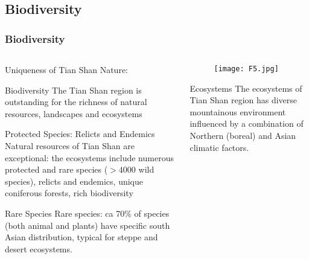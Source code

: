 \documentclass[pdflatex,compress,8pt,
	xcolor={dvipsnames,dvipsnames,svgnames,x11names,table},
	hyperref={colorlinks = true,
	breaklinks = true, 
	urlcolor = NavyBlue, 
	breaklinks = true}]{beamer}
\begin{document}
\subsection{Biodiversity}
\begin{frame}\frametitle{Biodiversity}
\begin{minipage}[0.4\textheight]{\textwidth}
\begin{columns}[T]
\begin{column}{0.5\textwidth}
Uniqueness of Tian Shan Nature:

\begin{alertblock}{Biodiversity}
The Tian Shan region is outstanding for the richness of natural resources, landscapes and ecosystems
\end{alertblock}

\begin{block}{Protected Species: Relicts and Endemics}
Natural resources of Tian Shan are exceptional: the ecosystems include numerous protected and rare species ($> 4000$ wild species), relicts and endemics, unique coniferous forests, rich biodiversity
\end{block}

\begin{examples}{Rare Species}
Rare species: ca 70\% of species (both animal and plants) have specific south Asian distribution, typical for steppe and desert ecosystems.
\end{examples}

\end{column}
\begin{column}{0.5\textwidth}

\begin{figure}[H]
	\centering
		\texttt{[image: F5.jpg]}
\end{figure}
\begin{block}{Ecosystems}
The ecosystems of Tian Shan region has diverse mountainous environment influenced by a combination of Northern (boreal) and Asian climatic factors.
\end{block}

\end{column}
\end{columns}
\end{minipage}

\end{frame}
\end{document}
